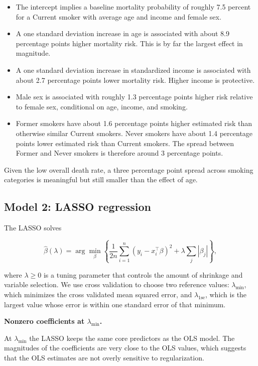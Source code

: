 \documentclass{article}
\begin{document}
\begin{itemize}
  \item The intercept implies a baseline mortality probability of roughly 7.5 percent for a Current smoker with average age and income and female sex.
  \item A one standard deviation increase in age is associated with about 8.9 percentage points higher mortality risk. This is by far the largest effect in magnitude.
  \item A one standard deviation increase in standardized income is associated with about 2.7 percentage points lower mortality risk. Higher income is protective.
  \item Male sex is associated with roughly 1.3 percentage points higher risk relative to female sex, conditional on age, income, and smoking.
  \item Former smokers have about 1.6 percentage points higher estimated risk than otherwise similar Current smokers. Never smokers have about 1.4 percentage points lower estimated risk than Current smokers. The spread between Former and Never smokers is therefore around 3 percentage points.
\end{itemize}

Given the low overall death rate, a three percentage point spread across smoking categories is meaningful but still smaller than the effect of age.

\subsection*{Model 2: LASSO regression}

The LASSO solves

\[
\hat\beta(\lambda)
=
\arg\min_{\beta}
\left\{
  \frac{1}{2n}\sum_{i=1}^n (y_i - x_i^\top \beta)^2
  + \lambda \sum_{j} |\beta_j|
\right\},
\]

where \(\lambda \ge 0\) is a tuning parameter that controls the amount of shrinkage and variable selection. We use cross validation to choose two reference values: \(\lambda_{\min}\), which minimizes the cross validated mean squared error, and \(\lambda_{1\text{se}}\), which is the largest value whose error is within one standard error of that minimum.

\medskip
\noindent\textbf{Nonzero coefficients at \(\lambda_{\min}\).}
\par


At \(\lambda_{\min}\) the LASSO keeps the same core predictors as the OLS model. The magnitudes of the coefficients are very close to the OLS values, which suggests that the OLS estimates are not overly sensitive to regularization.
\end{document}
